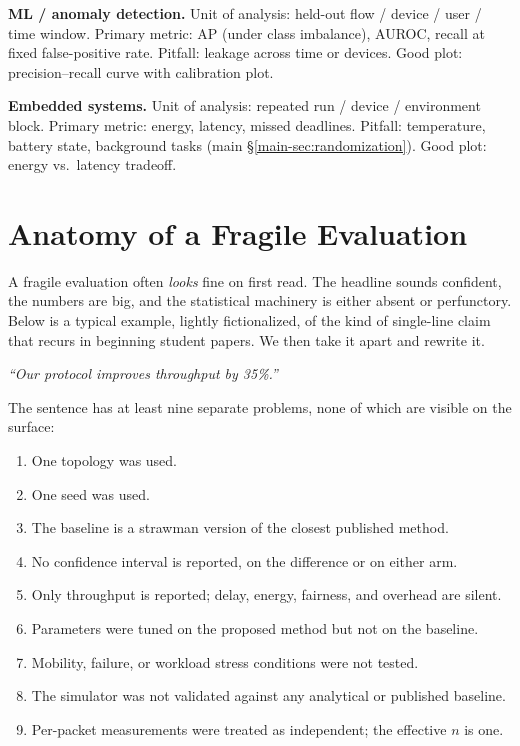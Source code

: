 \documentclass[11pt]{article}
\begin{document}
\begin{shaded*}
\noindent\textbf{ML / anomaly detection.}
Unit of analysis: held-out flow / device / user / time window.
Primary metric: AP (under class imbalance), AUROC, recall at fixed
false-positive rate.
Pitfall: leakage across time or devices.
Good plot: precision--recall curve with calibration plot.
\end{shaded*}

\begin{shaded*}
\noindent\textbf{Embedded systems.}
Unit of analysis: repeated run / device / environment block.
Primary metric: energy, latency, missed deadlines.
Pitfall: temperature, battery state, background tasks (main \S\ref{main-sec:randomization}).
Good plot: energy vs.\ latency tradeoff.
\end{shaded*}

\section{Anatomy of a Fragile Evaluation}
\label{sec:autopsy}

A fragile evaluation often \emph{looks} fine on first read. The headline
sounds confident, the numbers are big, and the statistical machinery is
either absent or perfunctory. Below is a typical example, lightly
fictionalized, of the kind of single-line claim that recurs in beginning
student papers. We then take it apart and rewrite it.

\begin{shaded*}
\noindent\emph{``Our protocol improves throughput by 35\%.''}
\end{shaded*}

The sentence has at least nine separate problems, none of which are
visible on the surface:

\begin{enumerate}[leftmargin=*, itemsep=1pt]
    \item One topology was used.
    \item One seed was used.
    \item The baseline is a strawman version of the closest published method.
    \item No confidence interval is reported, on the difference or on either arm.
    \item Only throughput is reported; delay, energy, fairness, and overhead are silent.
    \item Parameters were tuned on the proposed method but not on the baseline.
    \item Mobility, failure, or workload stress conditions were not tested.
    \item The simulator was not validated against any analytical or published baseline.
    \item Per-packet measurements were treated as independent; the effective $n$ is one.
\end{enumerate}
\end{document}
